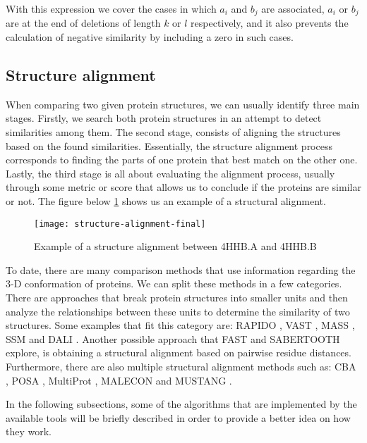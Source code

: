 With this expression we cover the cases in which $ a_{i} $ and $ b_{j} $ are associated, $ a_{i} $ or $ b_{j} $ are at the end of deletions of length $ k $ or $ l $ respectively, and it also prevents the calculation of negative similarity by including a zero in such cases.

\subsection{Structure alignment} 

When comparing two given protein structures, we can usually identify three main stages. Firstly, we search both protein structures in an attempt to detect similarities among them. The second stage, consists of aligning the structures based on the found similarities. Essentially, the structure alignment process corresponds to finding the parts of one protein that best match on the other one. Lastly, the third stage is all about evaluating the alignment process, usually through some metric or score that allows us to conclude if the proteins are similar or not. The figure below \ref{fig:structurealignment} shows us an example of a structural alignment.

\begin{figure}[htbp]
	\centering
	\texttt{[image: structure-alignment-final]}
	\caption{Example of a structure alignment between 4HHB.A and 4HHB.B}
	\label{fig:structurealignment}
\end{figure}

To date, there are many comparison methods that use information regarding the 3-D conformation of proteins. We can split these methods in a few categories. There are approaches that break protein structures into smaller units and then analyze the relationships between these units to determine the similarity of two structures. Some examples that fit this category are: RAPIDO \cite{mosca2008alignment}, VAST \cite{gibrat1996surprising}, MASS \cite{dror2003mass}, SSM \cite{krissinel2003protein} and DALI \cite{holm1993protein}. Another possible approach that FAST \cite{zhu2005fast} and SABERTOOTH \cite{teichert2007sabertooth} explore, is obtaining a structural alignment based on pairwise residue distances. Furthermore, there are also multiple structural alignment methods such as: CBA \cite{ebert2006development}, POSA \cite{ye2005multiple}, MultiProt \cite{shatsky2004method}, MALECON \cite{ochagavia2004progressive} and MUSTANG \cite{konagurthu2006mustang}.

In the following subsections, some of the algorithms that are implemented by the available tools will be briefly described in order to provide a better idea on how they work.

